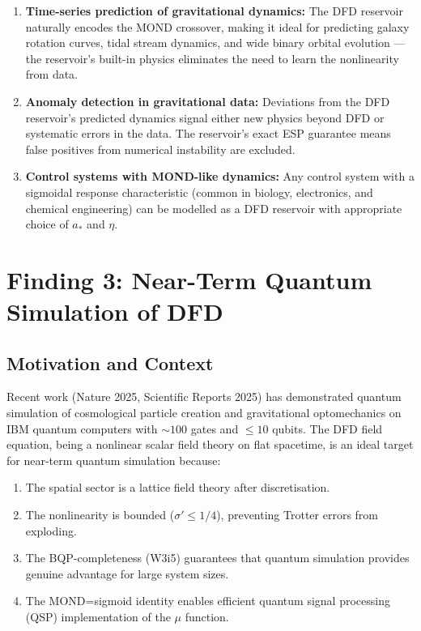 \documentclass[11pt]{article}
\theoremstyle{definition}
\theoremstyle{remark}
\begin{document}
\begin{enumerate}
\item \textbf{Time-series prediction of gravitational dynamics:} The DFD
  reservoir naturally encodes the MOND crossover, making it ideal for
  predicting galaxy rotation curves, tidal stream dynamics, and wide
  binary orbital evolution --- the reservoir's built-in physics eliminates
  the need to learn the nonlinearity from data.

\item \textbf{Anomaly detection in gravitational data:} Deviations from
  the DFD reservoir's predicted dynamics signal either new physics beyond
  DFD or systematic errors in the data. The reservoir's exact ESP
  guarantee means false positives from numerical instability are excluded.

\item \textbf{Control systems with MOND-like dynamics:} Any control
  system with a sigmoidal response characteristic (common in biology,
  electronics, and chemical engineering) can be modelled as a DFD reservoir
  with appropriate choice of $a_*$ and $\eta$.
\end{enumerate}

\section{Finding 3: Near-Term Quantum Simulation of DFD}
\label{sec:quantum-simulation}

\subsection{Motivation and Context}
\label{sec:qs-motivation}

Recent work (Nature 2025, Scientific Reports 2025) has demonstrated quantum
simulation of cosmological particle creation and gravitational optomechanics
on IBM quantum computers with $\sim 100$ gates and $\leq 10$ qubits. The
DFD field equation, being a nonlinear scalar field theory on flat spacetime,
is an ideal target for near-term quantum simulation because:

\begin{enumerate}[nosep]
\item The spatial sector is a lattice field theory after discretisation.
\item The nonlinearity is bounded ($\sigma' \leq 1/4$), preventing
  Trotter errors from exploding.
\item The BQP-completeness (W3i5) guarantees that quantum simulation
  provides genuine advantage for large system sizes.
\item The MOND=sigmoid identity enables efficient quantum signal processing
  (QSP) implementation of the $\mu$ function.
\end{enumerate}
\end{document}
